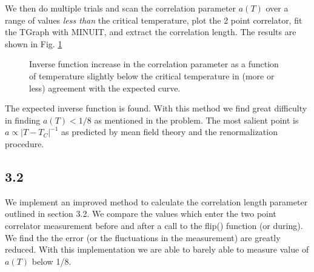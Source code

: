 \documentclass[singlepage,notitlepage,nofootinbib,11pt]{revtex4-1}
\begin{document}
We then do multiple trials and scan the correlation parameter $a(T)$ over a range of values {\it less than} the critical temperature, plot the 2 point correlator, fit the TGraph with MINUIT, and extract the correlation length. The results are shown in Fig. \ref{power_law}

\begin{figure}[h]
  \centering
  \captionsetup[subfigure]{labelformat=empty}
  \caption{\label{power_law} Inverse function increase in the correlation parameter as a function of temperature slightly below the critical temperature in (more or less) agreement with the expected curve. }
\end{figure}


The expected inverse function is found. With this method we find great difficulty in finding $a(T) < 1/8$ as mentioned in the problem. The most salient point is $a\propto |T-T_C|^{-1}$ as predicted by mean field theory and the renormalization procedure.

\subsection*{3.2}
We implement an improved method to calculate the correlation length parameter outlined in section 3.2. We compare the values which enter the two point correlator measurement before and after a call to the flip() function (or during). We find the the error (or the fluctuations in the measurement) are greatly reduced. With this implementation we are able to barely able to measure value of $a(T)$ below 1/8.
\end{document}
